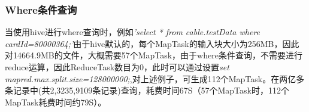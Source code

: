 \subsubsection{Where条件查询}
\par 当使用hive进行where查询时，例如\textsl{'select * from cable.testData where cardId=80000364;'}由于hive默认的，每个MapTask的输入块大小为256MB，因此对14664.9MB的文件，大概需要57个MapTask，由于where条件查询，不需要进行reduce运算，因此ReduceTask数目为0，此时可以通过设置\textsl{set mapred.max.split.size=128000000;},对上述例子，可生成112个MapTask。在两亿多条记录中(共2,3235,9109条记录)查询，耗费时间67S（57个MapTask时，112个MapTask耗费时间约79S）。
